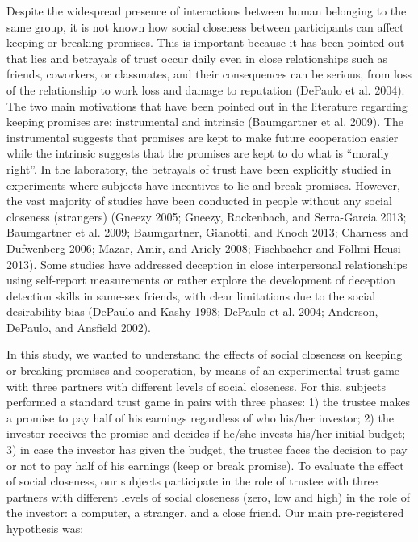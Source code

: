 \documentclass[smallextended]{svjour3}       %
\begin{document}
Despite the widespread presence of interactions between human belonging
to the same group, it is not known how social closeness between
participants can affect keeping or breaking promises. This is important
because it has been pointed out that lies and betrayals of trust occur
daily even in close relationships such as friends, coworkers, or
classmates, and their consequences can be serious, from loss of the
relationship to work loss and damage to reputation (DePaulo et al.
2004). The two main motivations that have been pointed out in the
literature regarding keeping promises are: instrumental and intrinsic
(Baumgartner et al. 2009). The instrumental suggests that promises are
kept to make future cooperation easier while the intrinsic suggests that
the promises are kept to do what is ``morally right''. In the
laboratory, the betrayals of trust have been explicitly studied in
experiments where subjects have incentives to lie and break promises.
However, the vast majority of studies have been conducted in people
without any social closeness (strangers) (Gneezy 2005; Gneezy,
Rockenbach, and Serra-Garcia 2013; Baumgartner et al. 2009; Baumgartner,
Gianotti, and Knoch 2013; Charness and Dufwenberg 2006; Mazar, Amir, and
Ariely 2008; Fischbacher and Föllmi-Heusi 2013). Some studies have
addressed deception in close interpersonal relationships using
self-report measurements or rather explore the development of deception
detection skills in same-sex friends, with clear limitations due to the
social desirability bias (DePaulo and Kashy 1998; DePaulo et al. 2004;
Anderson, DePaulo, and Ansfield 2002).

In this study, we wanted to understand the effects of social closeness
on keeping or breaking promises and cooperation, by means of an
experimental trust game with three partners with different levels of
social closeness. For this, subjects performed a standard trust game in
pairs with three phases: 1) the trustee makes a promise to pay half of
his earnings regardless of who his/her investor; 2) the investor
receives the promise and decides if he/she invests his/her initial
budget; 3) in case the investor has given the budget, the trustee faces
the decision to pay or not to pay half of his earnings (keep or break
promise). To evaluate the effect of social closeness, our subjects
participate in the role of trustee with three partners with different
levels of social closeness (zero, low and high) in the role of the
investor: a computer, a stranger, and a close friend. Our main
pre-registered hypothesis was:
\end{document}
